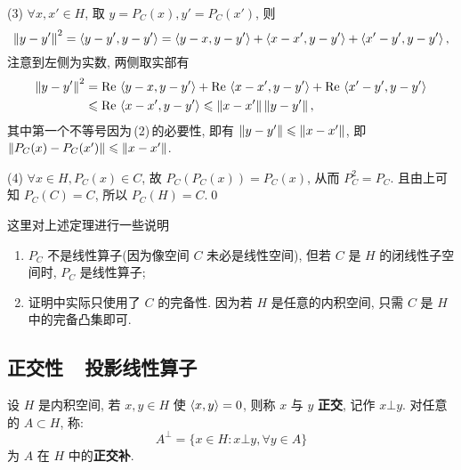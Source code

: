 \begin{Proof}
        (3) $ \forall x, x'\in H $, 取 $ y=P_{C}(x), y'=P_{C}(x') $, 则
        \[
            \left\| y-y' \right\|^{2}=\left\langle y-y', y-y' \right\rangle=\left\langle y-x, y-y' \right\rangle+\left\langle x-x', y-y' \right\rangle+\left\langle x'-y', y-y' \right\rangle,
        \]
        注意到左侧为实数, 两侧取实部有
        \[
            \begin{aligned}
                \left\| y-y' \right\|^{2} & =\mathrm{Re\,}\left\langle y-x, y-y' \right\rangle+\mathrm{Re\,}\left\langle x-x', y-y' \right\rangle+\mathrm{Re\,}\left\langle x'-y', y-y' \right\rangle\\
                & \leqslant \mathrm{Re\,}\left\langle x-x', y-y' \right\rangle\leqslant \left\| x-x' \right\|\left\| y-y' \right\|,
            \end{aligned}
        \]
        其中第一个不等号因为\,(2)\,的必要性, 即有 $ \left\| y-y' \right\|\leqslant\left\| x-x' \right\| $, 即 $ \left\| P_{C}(x)-P_{C}(x') \right\|\leqslant \left\| x-x' \right\| $.

        (4) $ \forall x\in H, P_{C}(x)\in C $, 故 $ P_{C}(P_{C}(x))=P_{C}(x) $, 从而 $ P_{C}^{2}=P_{C} $. 且由上可知 $ P_{C}(C)=C $, 所以 $ P_{C}(H)=C $.\qed
    \end{Proof}

    \begin{Remark}
        这里对上述定理进行一些说明
        \begin{enumerate}[(1)]
            \item $ P_{C} $ 不是线性算子(因为像空间 $ C $ 未必是线性空间), 但若 $ C $ 是 $ H $ 的闭线性子空间时, $ P_{C} $ 是线性算子;
            \item 证明中实际只使用了 $ C $ 的完备性. 因为若 $ H $ 是任意的内积空间, 只需 $ C $ 是 $ H $ 中的完备凸集即可.
        \end{enumerate}
    \end{Remark}

    \subsection{正交性\ \ 投影线性算子}

    \begin{Definition}[正交, 正交补]\label{def:正交, 正交补}
         设 $ H $ 是内积空间,  若 $ x, y\in H $ 使 $ \left\langle x, y \right\rangle=0 $, 则称 $ x $ 与 $ y $ \textbf{正交}, 记作 $ x\bot y $. 对任意的 $ A\subset H $, 称:
         \[
            A^{\bot}=\{ x\in H: x\bot y, \forall y\in A \}
         \]
         为 $ A $ 在 $ H $ 中的\textbf{正交补}.
    \end{Definition}

